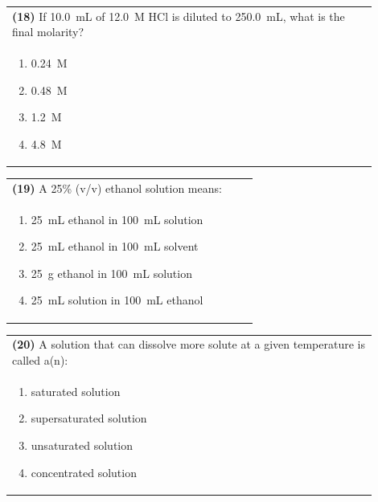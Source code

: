 \documentclass{article}
\begin{document}
\noindent\begin{tabular}{|p{0.9\linewidth}|}
\hline
\textbf{(18)} If 10.0~mL of 12.0~M HCl is diluted to 250.0~mL, what is the final molarity?\\[0.2cm]
\begin{minipage}[t]{0.85\linewidth}
\begin{enumerate}[label=\alph*.]
\item 0.24~M
\item 0.48~M
\item 1.2~M
\item 4.8~M
\end{enumerate}
\end{minipage}\\[0.2cm]
\hline
\end{tabular}

\noindent\begin{tabular}{|p{0.9\linewidth}|}
\hline
\textbf{(19)} A 25\% (v/v) ethanol solution means:\\[0.2cm]
\begin{minipage}[t]{0.85\linewidth}
\begin{enumerate}[label=\alph*.]
\item 25~mL ethanol in 100~mL solution
\item 25~mL ethanol in 100~mL solvent
\item 25~g ethanol in 100~mL solution
\item 25~mL solution in 100~mL ethanol
\end{enumerate}
\end{minipage}\\[0.2cm]
\hline
\end{tabular}

\noindent\begin{tabular}{|p{0.9\linewidth}|}
\hline
\textbf{(20)} A solution that can dissolve more solute at a given temperature is called a(n):\\[0.2cm]
\begin{minipage}[t]{0.85\linewidth}
\begin{enumerate}[label=\alph*.]
\item saturated solution
\item supersaturated solution
\item unsaturated solution
\item concentrated solution
\end{enumerate}
\end{minipage}\\[0.2cm]
\hline
\end{tabular}
\newpage
\end{document}
